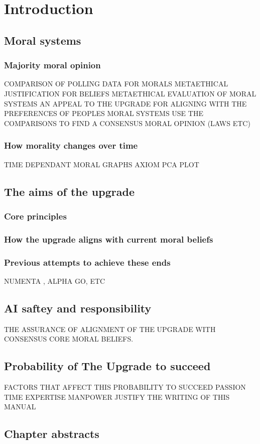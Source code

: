 \chapter{Introduction}
\minitoc
\section{Moral systems}
\subsection{Majority moral opinion}
COMPARISON OF POLLING DATA FOR MORALS
METAETHICAL JUSTIFICATION FOR BELIEFS
METAETHICAL EVALUATION OF MORAL SYSTEMS
AN APPEAL TO THE UPGRADE FOR ALIGNING WITH THE PREFERENCES OF PEOPLES MORAL SYSTEMS
USE THE COMPARISONS TO FIND A CONSENSUS MORAL OPINION (LAWS ETC)
\subsection{How morality changes over time}
TIME DEPENDANT MORAL GRAPHS
AXIOM PCA PLOT
\section{The aims of the upgrade}
\subsection{Core principles}
\subsection{How the upgrade aligns with current moral beliefs}
\subsection{Previous attempts to achieve these ends}
NUMENTA \cite{numentahome}, ALPHA GO, ETC
\section{AI saftey and responsibility}
THE ASSURANCE OF ALIGNMENT OF THE UPGRADE WITH CONSENSUS CORE MORAL BELIEFS.
\section{Probability of The Upgrade to succeed}
FACTORS THAT AFFECT THIS PROBABILITY TO SUCCEED
PASSION
TIME
EXPERTISE
MANPOWER
JUSTIFY THE WRITING OF THIS MANUAL 
\section{Chapter abstracts}
